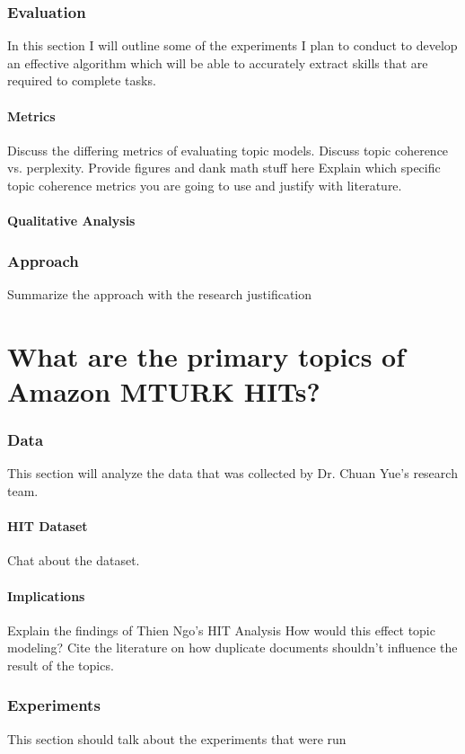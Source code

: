 \documentclass[letterpaper,12pt]{article}
\begin{document}
\subsection{Evaluation}
In this section I will outline some of the experiments I plan to conduct to develop an effective algorithm which
will be able to accurately extract skills that are required to complete tasks.

\subsubsection{Metrics}
Discuss the differing metrics of evaluating topic models. Discuss topic coherence vs. perplexity.
Provide figures and dank math stuff here
Explain which specific topic coherence metrics you are going to use and justify with literature.

\subsubsection{Qualitative Analysis}
\subsection{Approach}
Summarize the approach with the research justification

\chapter{What are the primary topics of Amazon MTURK HITs?}

\subsection{Data}
This section will analyze the data that was collected by Dr. Chuan Yue's research team.

\subsubsection{HIT Dataset}
Chat about the dataset.

\subsubsection{Implications}
Explain the findings of Thien Ngo's HIT Analysis
How would this effect topic modeling?
Cite the literature on how duplicate documents shouldn't influence the result of the topics.

\subsection{Experiments}
This section should talk about the experiments that were run
\end{document}
